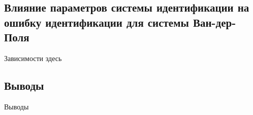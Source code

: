 

\subsection{Влияние параметров системы идентификации на ошибку идентификации для системы Ван-дер-Поля}  %


Зависимости здесь


\subsection{Выводы}  %

Выводы





